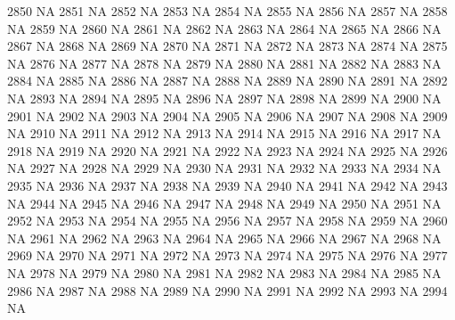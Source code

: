 \documentclass{article}
\begin{document}
\begin{Schunk}
\begin{Soutput}
2850           NA
2851           NA
2852           NA
2853           NA
2854           NA
2855           NA
2856           NA
2857           NA
2858           NA
2859           NA
2860           NA
2861           NA
2862           NA
2863           NA
2864           NA
2865           NA
2866           NA
2867           NA
2868           NA
2869           NA
2870           NA
2871           NA
2872           NA
2873           NA
2874           NA
2875           NA
2876           NA
2877           NA
2878           NA
2879           NA
2880           NA
2881           NA
2882           NA
2883           NA
2884           NA
2885           NA
2886           NA
2887           NA
2888           NA
2889           NA
2890           NA
2891           NA
2892           NA
2893           NA
2894           NA
2895           NA
2896           NA
2897           NA
2898           NA
2899           NA
2900           NA
2901           NA
2902           NA
2903           NA
2904           NA
2905           NA
2906           NA
2907           NA
2908           NA
2909           NA
2910           NA
2911           NA
2912           NA
2913           NA
2914           NA
2915           NA
2916           NA
2917           NA
2918           NA
2919           NA
2920           NA
2921           NA
2922           NA
2923           NA
2924           NA
2925           NA
2926           NA
2927           NA
2928           NA
2929           NA
2930           NA
2931           NA
2932           NA
2933           NA
2934           NA
2935           NA
2936           NA
2937           NA
2938           NA
2939           NA
2940           NA
2941           NA
2942           NA
2943           NA
2944           NA
2945           NA
2946           NA
2947           NA
2948           NA
2949           NA
2950           NA
2951           NA
2952           NA
2953           NA
2954           NA
2955           NA
2956           NA
2957           NA
2958           NA
2959           NA
2960           NA
2961           NA
2962           NA
2963           NA
2964           NA
2965           NA
2966           NA
2967           NA
2968           NA
2969           NA
2970           NA
2971           NA
2972           NA
2973           NA
2974           NA
2975           NA
2976           NA
2977           NA
2978           NA
2979           NA
2980           NA
2981           NA
2982           NA
2983           NA
2984           NA
2985           NA
2986           NA
2987           NA
2988           NA
2989           NA
2990           NA
2991           NA
2992           NA
2993           NA
2994           NA

\end{Soutput}
\end{Schunk}
\end{document}

